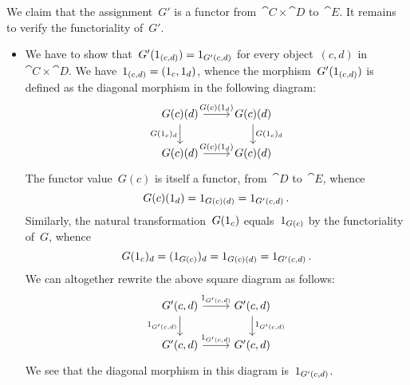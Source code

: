 We claim that the assignment~$G'$ is a functor from~$\cat{C} × \cat{D}$ to~$\cat{E}$.
It remains to verify the functoriality of~$G'$.
\begin{itemize}

	\item
		We have to show that~$G'(1_{(c, d)}) = 1_{G'(c, d)}$ for every object~$(c, d)$ in~$\cat{C} × \cat{D}$.
		We have~$1_{(c, d)} = (1_c, 1_d)$, whence the morphism~$G'(1_{(c, d)})$ is defined as the diagonal morphism in the following diagram:
		\[
			\begin{tikzcd}
				G(c)(d)
				\arrow{r}[above]{G(c)(\id_d)}
				\arrow{d}[left]{G(\id_c)_d}
				&
				G(c)(d)
				\arrow{d}[right]{G(\id_c)_{d}}
				\\
				G(c)(d)
				\arrow{r}[above]{G(c)(\id_d)}
				&
				G(c)(d)
			\end{tikzcd}
		\]
		The functor value~$G(c)$ is itself a functor, from~$\cat{D}$ to~$\cat{E}$, whence
		\[
			G(c)(1_d) = 1_{G(c)(d)} = 1_{G'(c, d)} \,.
		\]
		Similarly, the natural transformation~$G(1_c)$ equals~$1_{G(c)}$ by the functoriality of~$G$, whence
		\[
			G(1_c)_d = (1_{G(c)})_d = 1_{G(c)(d)} = 1_{G'(c, d)} \,.
		\]
		We can altogether rewrite the above square diagram as follows:
		\[
			\begin{tikzcd}
				G'(c, d)
				\arrow{r}[above]{\id_{G'(c,d)}}
				\arrow{d}[left]{\id_{G'(c,d)}}
				&
				G'(c, d)
				\arrow{d}[right]{\id_{G'(c,d)}}
				\\
				G'(c, d)
				\arrow{r}[above]{\id_{G'(c,d)}}
				&
				G'(c, d)
			\end{tikzcd}
		\]
		We see that the diagonal morphism in this diagram is~$1_{G'(c, d)}$.


\end{itemize}

